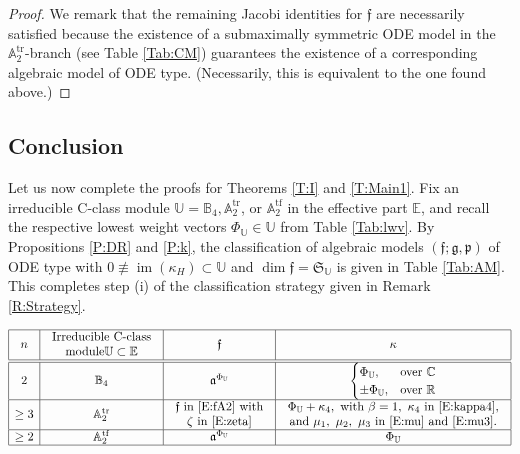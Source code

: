 \documentclass[pdftex]{sigma}%
\DeclareMathOperator{\img}{im}
\DeclareMathOperator{\tf}{tf}
\DeclareMathOperator{\tr}{tr}
\newcommand{\g}{\mathfrak{g}}
\newcommand\fa{\mathfrak{a}}
\newcommand\ff{\mathfrak{f}}
\newcommand\fp{\mathfrak{p}}
\newcommand\fS{\mathfrak{S}}
\newcommand{\R}{\mathbb{R}}
\newcommand{\C}{\mathbb{C}}
\newcommand\bbE{\mathbb{E}}
\newcommand\bbU{\mathbb{U}}
\newcommand\bbA{\mathbb{A}}
\newcommand\bbB{\mathbb{B}}
\numberwithin{equation}{section}
\begin{document}
\begin{proof}
 We remark that the remaining Jacobi identities for $\ff$ are necessarily satisfied because the existence of a submaximally symmetric ODE model in the $\bbA_2^{\tr}$-branch (see Table \ref{Tab:CM}) guarantees the existence of a corresponding algebraic model of ODE type. (Necessarily, this is equivalent to the one found above.)
\end{proof}

\subsection{Conclusion} \label{S:ProvRes}

Let us now complete the proofs for Theorems \ref{T:I} and \ref{T:Main1}. Fix an irreducible C-class module $\bbU = \bbB_4, \bbA_2^{\tr}$, or $\bbA_2^{\tf}$ in the effective part $\bbE$, and recall the respective lowest weight vectors $\Phi_\bbU \in \bbU$ from Table \ref{Tab:lwv}. By Propositions \ref{P:DR} and \ref{P:k}, the classification of algebraic models $(\ff;\g,\fp)$ of ODE type with $0 \not \equiv \img(\kappa_H) \subset \bbU$ and $\dim \ff = \fS_{\bbU}$ is given in Table \ref{Tab:AM}. This completes step (i) of the classification strategy given in Remark \ref{R:Strategy}.

\begin{table}[h]\renewcommand{\arraystretch}{1.3}
\centering
$\begin{array}{|c|c|c|c|} \hline
n& \begin{array}{c}
\text{Irreducible C-class}\\ \text{module} \bbU\subset \bbE
\end{array} &\ff & \kappa \\ \hline\hline
2 & \bbB_4 & \fa^{\Phi_\bbU} & \begin{cases}
\Phi_\bbU, & \text{over}\ \C \\
\pm \Phi_\bbU, & \text{over}\ \R
\end{cases} \\\hline
\ge 3 & \bbA_2^{\tr} & \begin{array}{c}
\ff \ \text{in} \ \eqref{E:fA2} \ \text{with}\\
\zeta \ \text{in} \ \eqref{E:zeta}
\end{array} & \begin{array}{c}
\Phi_\bbU + \kappa_4,\ \text{with}\ \beta =1,\ \kappa_4 \ \text{in}\ \eqref{E:kappa4},\\
\text{and}\ \mu_1, \ \mu_2, \ \mu_3 \ \text{in} \ \eqref{E:mu} \ \text{and} \ \eqref{E:mu3}.
\end{array} \\ \hline
\ge 2 & \bbA_2^{\tf} & \fa^{\Phi_\bbU} & \Phi_\bbU\\ \hline
\end{array}$
\caption{Classification of algebraic models of ODE type with $0 \not \equiv \img(\kappa_H) \subset \bbU$ and $\dim \ff = \fS_\bbU$.}	
\label{Tab:AM}
\end{table}
\end{document}
